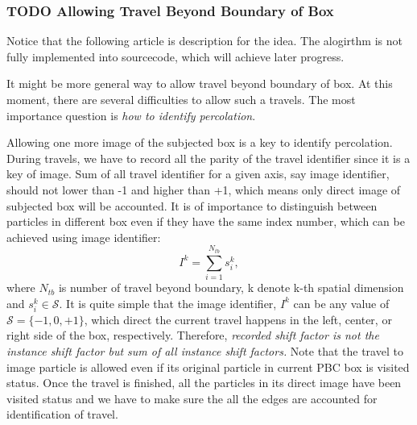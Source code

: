 \documentclass[11pt]{article}
\begin{document}
\subsubsection{{\bfseries\sffamily TODO} Allowing Travel Beyond Boundary of Box}
\label{sec:orgheadline10}
Notice that the following article is description for the idea. The alogirthm is not fully implemented into sourcecode, which will achieve later progress.

It might be more general way to allow travel beyond boundary of box. At this moment, there are several difficulties to allow such a travels. The most importance question is \emph{how to identify percolation}.

Allowing one more image of the subjected box is a key to identify percolation. During travels, we have to record all the parity of the travel identifier since it is a key of image. Sum of all travel identifier for a given axis, say image identifier, should not lower than -1 and higher than +1, which means only direct image of subjected box will be accounted. It is of importance to distinguish between particles in different box even if they have the same index number, which can be achieved using image identifier:
\begin{equation}
I^{k} = \sum_{i=1}^{N_{tb}} s^{k}_i,
\end{equation}
where \(N_{tb}\) is number of travel beyond boundary, k denote k-th spatial dimension and \(s^k_i \in \mathscr{S}\). It is quite simple that the image identifier, \(I^{k}\) can be any value of \(\mathscr{S}=\{-1, 0, +1\}\), which direct the current travel happens in the left, center, or right side of the box, respectively. Therefore, \emph{recorded shift factor is not the instance shift factor but sum of all instance shift factors.} Note that the travel to image particle is allowed even if its original particle in current PBC box is visited status. Once the travel is finished, all the particles in its direct image have been visited status and we have to make sure the all the edges are accounted for identification of travel. 
\end{document}

